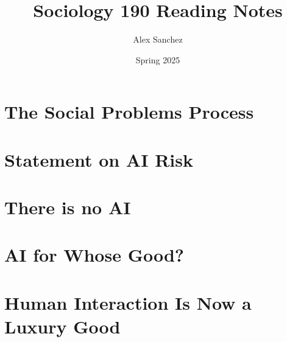 \documentclass[openany]{book}
\title{Sociology 190 Reading Notes}
\author{Alex Sanchez}
\date{Spring 2025}
\begin{document}
\maketitle

\chapter{The Social Problems Process}

\chapter{Statement on AI Risk}

\chapter{There is no AI}

\chapter{AI for Whose Good?}


\chapter{Human Interaction Is Now a Luxury Good}

\end{document}
